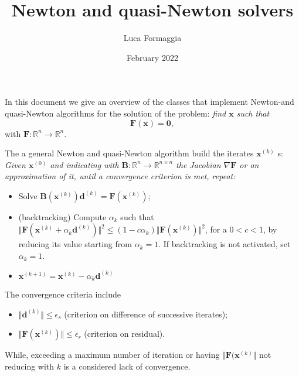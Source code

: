\documentclass{article}
\author{Luca Formaggia}
\title{Newton and quasi-Newton solvers}
\date{February 2022}
\begin{document}
\maketitle

In this document we give an overview of the classes that implement Newton-and quasi-Newton algorithms for the solution of the problem: \emph{find $\mathbf{x}$
    such that}
\begin{equation}
\mathbf{F}(\mathbf{x})=\mathbf{0},
\end{equation}
    with $\mathbf{F}:\mathbb{R}^n\to\mathbb{R}^n$.
   
The a general Newton and quasi-Newton algorithm build the iterates   $\mathbf{x}^{(k)}$ s:
\emph{Given $\mathbf{x}^{(0)}$ and indicating with $\mathbf{B}:\mathbb{R}^n\to\mathbb{R}^{n\times n}$ the Jacobian $\nabla\mathbf{F}$ or an approximation of it, until a convergence criterion is met, repeat:} 
\begin{itemize}
    \item Solve $\mathbf{B}(\mathbf{x}^{(k)})\mathbf{d}^{(k)}=\mathbf{F}(\mathbf{x}^{(k)})$;
    \item (backtracking) Compute $\alpha_k$ such that
    $\Vert\mathbf{F}(\mathbf{x}^{(k)}+\alpha_k\mathbf{d}^{(k)})\Vert^2\le(1-c\alpha_k) \Vert\mathbf{F}(\mathbf{x}^{(k)})\Vert^2$,
    for a $0<c<1$, by reducing its value starting from $\alpha_k=1$. If backtracking is not activated, set $\alpha_k=1$.
    \item $\mathbf{x}^{(k+1)}=\mathbf{x}^{(k)} -\alpha_k\mathbf{d}^{(k)}$
\end{itemize}

The convergence criteria include
\begin{itemize}
    \item $\Vert\mathbf{d}^{(k)}\Vert\le\epsilon_s$ (criterion on difference of successive iterates);
    \item $\Vert\mathbf{F}(\mathbf{x}^{(k)})\Vert\le\epsilon_r$ (criterion on residual).
\end{itemize}
While, exceeding a maximum number of iteration or having $\Vert\mathbf{F}(\mathbf{x}^{(k)}\Vert$ not reducing with $k$
is a considered lack of convergence.
\end{document}

